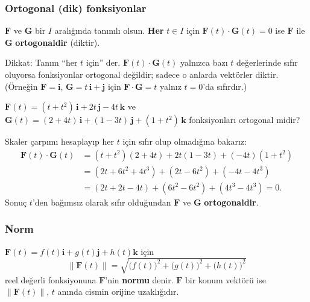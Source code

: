 \subsubsection{Ortogonal (dik) fonksiyonlar}

\begin{tanim}
$\mathbf F$ ve $\mathbf G$ bir $I$ aralığında tanımlı olsun. \textbf{Her} $t\in I$ için $\mathbf F(t)\cdot\mathbf G(t)=0$ ise
$\mathbf F$ ile $\mathbf G$ \textbf{ortogonaldir} (diktir).
\end{tanim}

Dikkat: Tanım ``her $t$ için'' der. $\mathbf F(t)\cdot\mathbf G(t)$ yalnızca bazı $t$ değerlerinde sıfır oluyorsa
fonksiyonlar ortogonal değildir; sadece o anlarda vektörler diktir. (Örneğin $\mathbf F=\mathbf i$, $\mathbf G=t\,\mathbf i+\mathbf j$ için
$\mathbf F\cdot\mathbf G=t$ yalnız $t=0$'da sıfırdır.)

\begin{soru}
$\mathbf F(t)=(t+t^2)\,\mathbf i+2t\,\mathbf j-4t\,\mathbf k$ ve $\mathbf G(t)=(2+4t)\,\mathbf i+(1-3t)\,\mathbf j+(1+t^2)\,\mathbf k$
fonksiyonları ortogonal midir?
\end{soru}
\begin{cevap}
Skaler çarpımı hesaplayıp her $t$ için sıfır olup olmadığına bakarız:
\begin{align*}
\mathbf F(t)\cdot\mathbf G(t)&=(t+t^2)(2+4t)+2t(1-3t)+(-4t)(1+t^2)\\
&=(2t+6t^2+4t^3)+(2t-6t^2)+(-4t-4t^3)\\
&=(2t+2t-4t)+(6t^2-6t^2)+(4t^3-4t^3)=0 .
\end{align*}
Sonuç $t$'den bağımsız olarak sıfır olduğundan $\mathbf F$ ve $\mathbf G$ \textbf{ortogonaldir}.
\end{cevap}

\subsubsection{Norm}

\begin{tanim}[Norm]
$\mathbf F(t)=f(t)\mathbf i+g(t)\mathbf j+h(t)\mathbf k$ için
\[ \|\mathbf F(t)\|=\sqrt{\big(f(t)\big)^2+\big(g(t)\big)^2+\big(h(t)\big)^2} \]
reel değerli fonksiyonuna $\mathbf F$'nin \textbf{normu} denir. $\mathbf F$ bir konum vektörü ise $\|\mathbf F(t)\|$,
$t$ anında cismin orijine uzaklığıdır.
\end{tanim}

